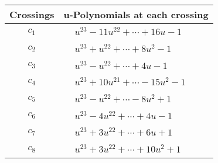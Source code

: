\documentclass[1p]{elsarticle_modified}
\theoremstyle{definition}
\begin{document}
\begin{tabular}{m{50pt}|m{274pt}}
Crossings & \hspace{64pt}u-Polynomials at each crossing \\
\hline $$\begin{aligned}c_{1}\end{aligned}$$&$\begin{aligned}
&u^{23}-11 u^{22}+\cdots+16 u-1
\end{aligned}$\\
\hline $$\begin{aligned}c_{2}\end{aligned}$$&$\begin{aligned}
&u^{23}+u^{22}+\cdots+8 u^2-1
\end{aligned}$\\
\hline $$\begin{aligned}c_{3}\end{aligned}$$&$\begin{aligned}
&u^{23}- u^{22}+\cdots+4 u-1
\end{aligned}$\\
\hline $$\begin{aligned}c_{4}\end{aligned}$$&$\begin{aligned}
&u^{23}+10 u^{21}+\cdots-15 u^2-1
\end{aligned}$\\
\hline $$\begin{aligned}c_{5}\end{aligned}$$&$\begin{aligned}
&u^{23}- u^{22}+\cdots-8 u^2+1
\end{aligned}$\\
\hline $$\begin{aligned}c_{6}\end{aligned}$$&$\begin{aligned}
&u^{23}-4 u^{22}+\cdots+4 u-1
\end{aligned}$\\
\hline $$\begin{aligned}c_{7}\end{aligned}$$&$\begin{aligned}
&u^{23}+3 u^{22}+\cdots+6 u+1
\end{aligned}$\\
\hline $$\begin{aligned}c_{8}\end{aligned}$$&$\begin{aligned}
&u^{23}+3 u^{22}+\cdots+10 u^2+1
\end{aligned}$\\

\end{tabular}
\end{document}
